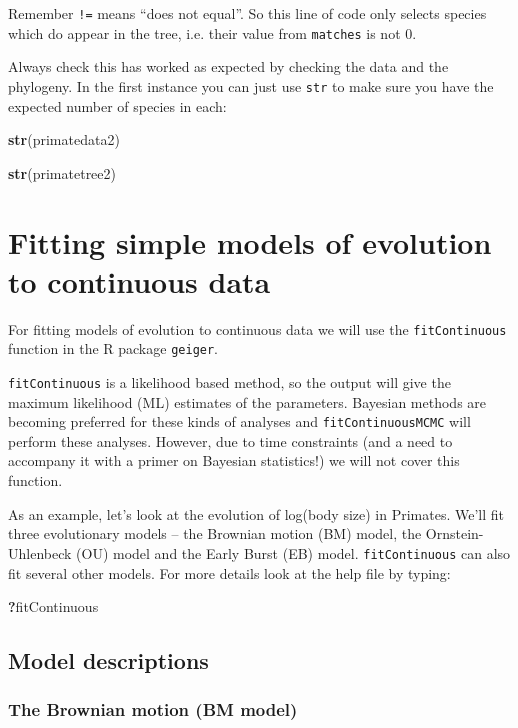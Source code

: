 \documentclass[11pt]{article}
\newcommand{\KeywordTok}[1]{\textcolor[rgb]{0.13,0.29,0.53}{\textbf{{#1}}}}
\newcommand{\NormalTok}[1]{{#1}}
\begin{document}
Remember \texttt{!=} means ``does not equal''. So this line of code only selects species which do appear in the tree, i.e. their value from \texttt{matches} is not 0. 

Always check this has worked as expected by checking the data and the phylogeny. In the first instance you can just use \texttt{str} to make sure you have the expected number of species in each:

\begin{snugshade}
\begin{Highlighting}[]
\KeywordTok{str}\NormalTok{(primatedata2)}

\KeywordTok{str}\NormalTok{(primatetree2)}
\end{Highlighting}
\end{snugshade}

\section{Fitting simple models of evolution to continuous data}

For fitting models of evolution to continuous data we will use the \texttt{fitContinuous} function in the R package \texttt{geiger}.

\texttt{fitContinuous} is a likelihood based method, so the output will give the maximum likelihood (ML) estimates of the parameters. Bayesian methods are becoming preferred for these kinds of analyses and \texttt{fitContinuousMCMC} will perform these analyses. However, due to time constraints (and a need to accompany it with a primer on Bayesian statistics!) we will not cover this function.

As an example, let’s look at the evolution of log(body size) in Primates. We’ll fit three evolutionary models – the Brownian motion (BM) model, the Ornstein-Uhlenbeck (OU) model and the Early Burst (EB) model. \texttt{fitContinuous} can also fit several other models. For more details look at the help file by typing:

\begin{snugshade}
\begin{Highlighting}[]
\KeywordTok{?}\NormalTok{fitContinuous}
\end{Highlighting}
\end{snugshade}

\subsection{Model descriptions}
\subsubsection{The Brownian motion (BM model)}
\end{document}
